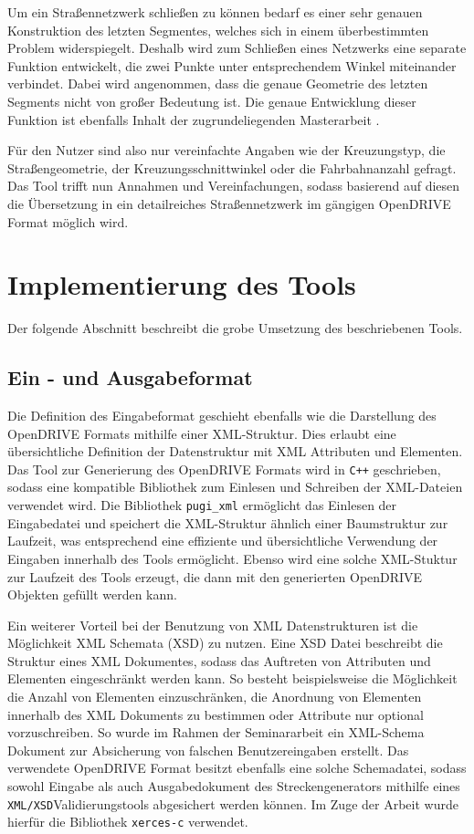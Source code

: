 Um ein Straßennetzwerk schließen zu können bedarf es einer sehr genauen Konstruktion des letzten Segmentes, welches sich in einem überbestimmten Problem widerspiegelt. Deshalb wird zum Schließen eines Netzwerks eine separate Funktion entwickelt, die zwei Punkte unter entsprechendem Winkel miteinander verbindet. Dabei wird angenommen, dass die genaue Geometrie des letzten Segments nicht von großer Bedeutung ist. Die genaue Entwicklung dieser Funktion ist ebenfalls Inhalt der zugrundeliegenden Masterarbeit \cite{Russ.2019}.

Für den Nutzer sind also nur vereinfachte Angaben wie der Kreuzungstyp, die Straßengeometrie, der Kreuzungsschnittwinkel oder die Fahrbahnanzahl gefragt. Das Tool trifft nun Annahmen und Vereinfachungen, sodass basierend auf diesen die Übersetzung in ein detailreiches Straßennetzwerk im gängigen OpenDRIVE Format möglich wird.

\chapter{Implementierung des Tools}
Der folgende Abschnitt beschreibt die grobe Umsetzung des beschriebenen Tools. 

\section{Ein - und Ausgabeformat}
Die Definition des Eingabeformat geschieht ebenfalls wie die Darstellung des OpenDRIVE Formats mithilfe einer XML-Struktur. Dies erlaubt eine übersichtliche Definition der Datenstruktur mit XML Attributen und Elementen. Das Tool zur Generierung des OpenDRIVE Formats wird in \texttt{C++} geschrieben, sodass eine kompatible Bibliothek zum Einlesen und Schreiben der XML-Dateien verwendet wird. Die Bibliothek \texttt{pugi\_xml}\cite{pugixml.2019} ermöglicht das Einlesen der Eingabedatei und speichert die XML-Struktur ähnlich einer Baumstruktur zur Laufzeit, was entsprechend eine effiziente und übersichtliche Verwendung der Eingaben innerhalb des Tools ermöglicht. Ebenso wird eine solche XML-Stuktur zur Laufzeit des Tools erzeugt, die dann mit den generierten OpenDRIVE Objekten gefüllt werden kann.

Ein weiterer Vorteil bei der Benutzung von XML Datenstrukturen ist die Möglichkeit XML Schemata (XSD) zu nutzen. Eine XSD Datei beschreibt die Struktur eines XML Dokumentes, sodass das Auftreten von Attributen und Elementen eingeschränkt werden kann. So besteht beispielsweise die Möglichkeit die Anzahl von Elementen einzuschränken, die Anordnung von Elementen innerhalb des XML Dokuments zu bestimmen oder Attribute nur optional vorzuschreiben. So wurde im Rahmen der Seminararbeit ein XML-Schema Dokument zur Absicherung von falschen Benutzereingaben erstellt. Das verwendete OpenDRIVE Format besitzt ebenfalls eine solche Schemadatei, sodass sowohl Eingabe als auch Ausgabedokument des Streckengenerators mithilfe eines \texttt{XML/XSD}Validierungstools abgesichert werden können. Im Zuge der Arbeit wurde hierfür die Bibliothek \texttt{xerces-c}\cite{Xerces.2019} verwendet.

